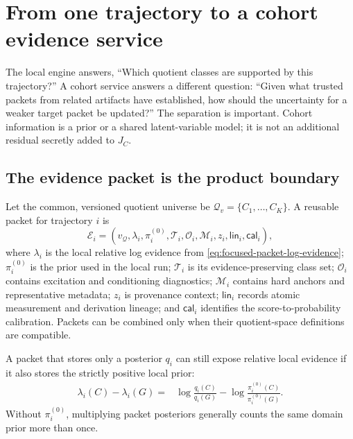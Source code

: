 \documentclass[11pt]{article}
\begin{document}
    \section{From one trajectory to a cohort evidence service}
    \label{sec:cohort-main}

    The local engine answers, ``Which quotient classes are supported by this trajectory?''
    A cohort service answers a different question: ``Given what trusted packets from related
    artifacts have established, how should the uncertainty for a weaker target packet be
    updated?'' The separation is important. Cohort information is a prior or a shared
    latent-variable model; it is not an additional residual secretly added to $J_C$.

    \subsection{The evidence packet is the product boundary}

    Let the common, versioned quotient universe be
    $\mathcal Q_v=\{C_1,\ldots,C_K\}$. A reusable packet for trajectory $i$ is
    \begin{equation}
        \boxed{
            \mathcal E_i=
            (v_{\mathcal Q},\lambda_i,\pi_i^{(0)},\mathcal T_i,
            \mathcal O_i,\mathcal M_i,z_i,\mathsf{lin}_i,\mathsf{cal}_i),}
        \label{eq:cohort-packet}
    \end{equation}
    where $\lambda_i$ is the local relative log evidence from
    \eqref{eq:focused-packet-log-evidence}; $\pi_i^{(0)}$ is the prior used in the local run;
    $\mathcal T_i$ is its evidence-preserving class set; $\mathcal O_i$ contains excitation
    and conditioning diagnostics; $\mathcal M_i$ contains hard anchors and representative
    metadata; $z_i$ is provenance context; $\mathsf{lin}_i$ records atomic measurement and
    derivation lineage; and $\mathsf{cal}_i$ identifies the score-to-probability calibration.
    Packets can be combined only when their quotient-space definitions are compatible.

    A packet that stores only a posterior $q_i$ can still expose relative local evidence if
    it also stores the strictly positive local prior:
    \begin{equation}
        \begin{split}
            \lambda_i(C)-\lambda_i(G)
            ={}&\log\frac{q_i(C)}{q_i(G)}
            -\log\frac{\pi_i^{(0)}(C)}{\pi_i^{(0)}(G)}.
            \label{eq:posterior-deprior}
        \end{split}
    \end{equation}
    Without $\pi_i^{(0)}$, multiplying packet posteriors generally counts the same domain
    prior more than once.
\end{document}
